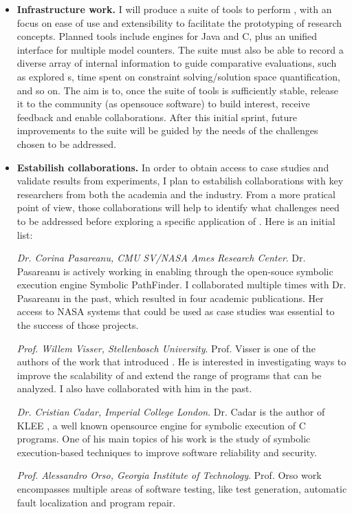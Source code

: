 \documentclass[10pt]{article}
\newcounter{list}
\begin{document}
\begin{itemize}
\item \textbf{Infrastructure work.} I will produce a suite of tools to
  perform \PSE{}, with an focus on ease of use and extensibility to
  facilitate the prototyping of research concepts. Planned tools
  include \PSE{} engines for Java and C, plus an unified interface for
  multiple model counters. The suite must also be able to record a
  diverse array of internal information to guide comparative
  evaluations, such as explored \PC s, time spent on constraint
  solving/solution space quantification, and so on. The aim is to,
  once the suite of tools is sufficiently stable, release it to the
  community (as opensouce software) to build interest, receive
  feedback and enable collaborations. After this initial sprint,
  future improvements to the suite will be guided by the needs of the
  challenges chosen to be addressed.

\item \textbf{Estabilish collaborations.} In order to obtain access to
  case studies and validate results from experiments, I plan to
  estabilish collaborations with key researchers from both the academia
  and the industry. From a more pratical point of view, those
  collaborations will help to identify what challenges need to be
  addressed before exploring a specific application of \PSE{}. Here is
  an initial list:

  \subitem \textit{Dr. Corina Pasareanu, CMU SV/NASA Ames Research
    Center}. Dr. Pasareanu is actively working in enabling \PSE{}
  through the open-souce symbolic execution engine Symbolic
  PathFinder. I collaborated multiple times with Dr. Pasareanu in the
  past, which resulted in four academic publications. Her access to
  NASA systems that could be used as case studies was essential to the
  success of those projects.

  \subitem \textit{Prof. Willem Visser, Stellenbosch University}.
  Prof. Visser is one of the authors of the work that introduced \PSE{}
  \cite{geldenhuys2012probabilistic}. He is interested in
  investigating ways to improve the scalability of \PSE{} and extend
  the range of programs that can be analyzed. I also have collaborated
  with him in the past.

  \subitem \textit{Dr. Cristian Cadar, Imperial College
    London}. Dr. Cadar is the author of KLEE \cite{cadar2008klee}, a
  well known opensource engine for symbolic execution of C programs.
  One of his main topics of his work is the study of symbolic
  execution-based techniques to improve software reliability and
  security.
    
  \subitem \textit{Prof. Alessandro Orso, Georgia Institute of
    Technology}. Prof. Orso work encompasses multiple areas of software
  testing, like test generation, automatic fault localization and
  program repair.
  
\end{itemize}
\end{document}
